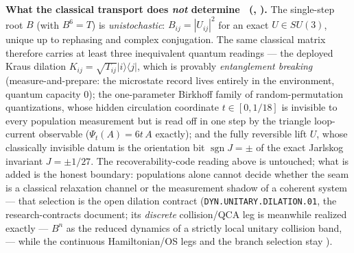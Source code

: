 \documentclass[11pt,a4paper]{article}
\begin{document}
\noindent\textbf{What the classical transport does \emph{not} determine \mE\
(, ).}  The single-step
root $B$ (with $B^6=T$) is \emph{unistochastic}: $B_{ij}=|U_{ij}|^2$ for an exact $U\in SU(3)$, unique up
to rephasing and complex conjugation.  The same classical matrix therefore carries at least three
inequivalent quantum readings --- the deployed Kraus dilation $K_{ij}=\sqrt{T_{ij}}|i\rangle\langle j|$,
which is provably \emph{entanglement breaking} (measure-and-prepare: the microstate record lives entirely
in the environment, quantum capacity $0$); the one-parameter Birkhoff family of random-permutation
quantizations, whose hidden circulation coordinate $t\in[0,1/18]$ is invisible to every population
measurement but is read off in one step by the triangle loop-current observable ($\Psi_t(A)=6t\,A$
exactly); and the fully reversible lift $U$, whose classically invisible datum is the orientation bit
$\operatorname{sgn}J=\pm$ of the exact Jarlskog invariant $J=\pm1/27$.  The recoverability-code reading
above is untouched; what is added is the honest boundary: populations alone cannot decide whether the seam
is a classical relaxation channel or the measurement shadow of a coherent system --- that selection is the
open dilation contract (\texttt{DYN.UNITARY.DILATION.01}, the research-contracts document; its
\emph{discrete} collision/QCA leg is meanwhile realized exactly --- $B^n$ as the reduced dynamics of a
strictly local unitary collision band, \veri{v984\_markov\_qca\_dilation.py} --- while the continuous
Hamiltonian/OS legs and the branch selection stay \mO).
\end{document}

